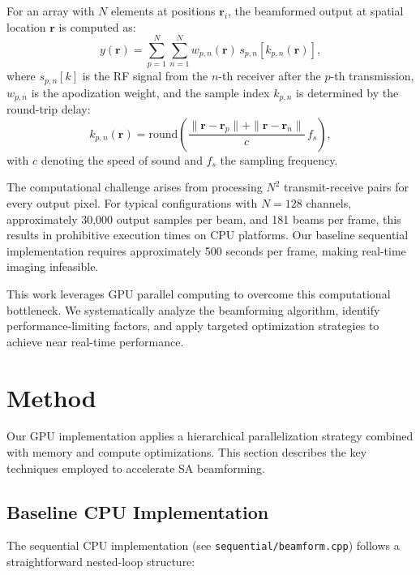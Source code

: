 \documentclass{article}
\begin{document}
For an array with $N$ elements at positions $\mathbf{r}_i$, the beamformed output at spatial location $\mathbf{r}$ is computed as:
\begin{equation}
y(\mathbf{r}) = \sum_{p=1}^{N} \sum_{n=1}^{N} w_{p,n}(\mathbf{r}) \, s_{p,n}\!\left[k_{p,n}(\mathbf{r})\right],
\label{eq:SA_beamforming}
\end{equation}
where $s_{p,n}[k]$ is the RF signal from the $n$-th receiver after the $p$-th transmission, $w_{p,n}$ is the apodization weight, and the sample index $k_{p,n}$ is determined by the round-trip delay:
\begin{equation}
k_{p,n}(\mathbf{r}) = \mathrm{round}\!\left(\frac{\|\mathbf{r} - \mathbf{r}_p\| + \|\mathbf{r} - \mathbf{r}_n\|}{c} \, f_s\right),
\label{eq:delay_index}
\end{equation}
with $c$ denoting the speed of sound and $f_s$ the sampling frequency.

The computational challenge arises from processing $N^2$ transmit-receive pairs for every output pixel. For typical configurations with $N=128$ channels, approximately 30,000 output samples per beam, and 181 beams per frame, this results in prohibitive execution times on CPU platforms. Our baseline sequential implementation requires approximately 500 seconds per frame, making real-time imaging infeasible.

This work leverages GPU parallel computing to overcome this computational bottleneck. We systematically analyze the beamforming algorithm, identify performance-limiting factors, and apply targeted optimization strategies to achieve near real-time performance.

\section{Method}

Our GPU implementation applies a hierarchical parallelization strategy combined with memory and compute optimizations. This section describes the key techniques employed to accelerate SA beamforming.

\subsection{Baseline CPU Implementation}

The sequential CPU implementation (see \texttt{sequential/beamform.cpp}) follows a straightforward nested-loop structure:
\end{document}
